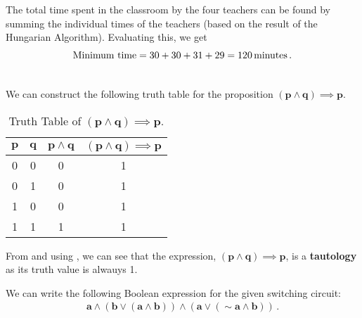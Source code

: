 \begin{subquestions}
\begin{subsubquestions}
\subsubquestion

The total time spent in the classroom by the four teachers can be found by summing the individual times of the teachers (based on the result of the Hungarian Algorithm). Evaluating this, we get
		\begin{align}
			\text{Minimum time} = 30+30+31+29 = 120 \, \text{minutes}\,. \\ \nonumber 
		\end{align}	
	\end{subsubquestions}
	
	
\subquestion
	
We can construct the following truth table for the proposition $\boldsymbol{(p \land q) \implies p}$.
\begin{table}[ht]
		\centering
		\begin{tabular}{|c|c|c|c|}
			\hline
			$\boldsymbol{p}$ & $\boldsymbol{q}$ & $\boldsymbol{p \land q}$ & $\boldsymbol{(p \land q) \implies p}$ \\
			\hline
			0 & 0 & 0 & 1 \\
			0 & 1 & 0 & 1 \\
			1 & 0 & 0 & 1 \\
			1 & 1 & 1 & 1 \\
			\hline
		\end{tabular}
		\caption{\label{2015:q2:tab:TrthTab} Truth Table of $\boldsymbol{(p \land q) \implies p}$.}
\end{table}        
	
From  and using , we can see that the expression, $\boldsymbol{(p \land q) \implies p}$, is a \textbf{tautology} as its truth value is alwauys 1. \\
	
		
\subquestion
	
\begin{subsubquestions}
		
\subsubquestion
		
We can write the following Boolean expression for the given switching circuit:
		\begin{align}
			\boldsymbol{a \land (b \lor (a \land b)) \land (a \lor (\sim a \land b))}\,.
		\end{align}	
		

\end{subsubquestions}
\end{subquestions}
